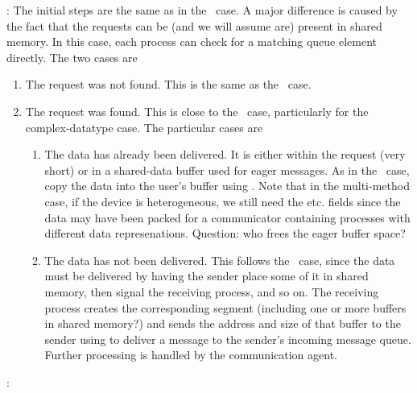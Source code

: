 \begin{mmadi}
\begin{shmem}
:
The initial steps are the same as in the \tcpname\ case.  A major difference
is caused by the fact that the requests can be (and we will assume are)
present in shared memory.  In this case, each process can check for a matching
queue element directly. The two cases are
\begin{enumerate}
\item The request was not found.  This is the same as the \tcpname\ case.
\item The request was found.  This is close to the \tcpname\ case,
  particularly for the complex-datatype case.  The particular cases are
  \begin{enumerate}
  \item The data has already been delivered.  It is either within the request
    (very short) or in a shared-data buffer used for eager messages.  As in
    the \tcpname\ case, copy the data into the user's buffer using
    .  Note that in the multi-method case, if the device
    is heterogeneous, we still need the  etc. fields
    since the data may have been packed for a communicator containing
    processes with different data represenations.
    Question: who frees the eager buffer space?  
  \item The data has not been delivered.  This follows the \tcpname\ case,
    since the data must be delivered by having the sender place some of it in
    shared memory, then signal the receiving process, and so on.  The
    receiving process creates the corresponding segment (including one or more
    buffers in shared memory?) and sends the address and size of that buffer
    to the sender using  to deliver a message to the
    sender's incoming message queue.  Further processing is handled by the
    communication agent.
  \end{enumerate}
\end{enumerate}


:


\end{shmem}
\end{mmadi}
